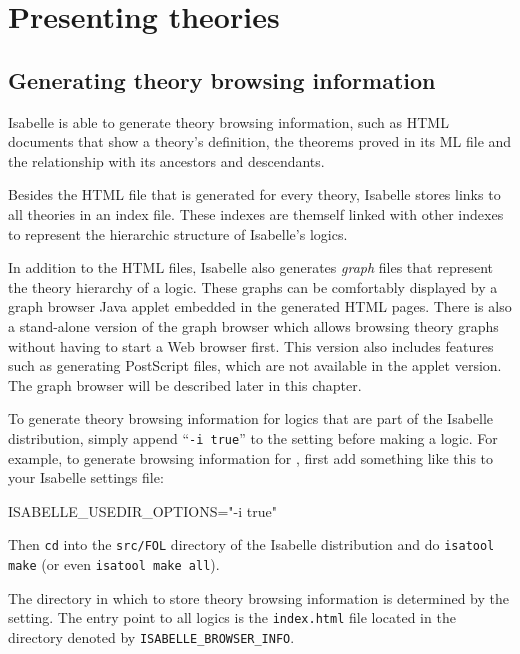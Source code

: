

\chapter{Presenting theories}

\section{Generating theory browsing information} \label{sec:info}

Isabelle is able to generate theory browsing information, such as HTML
documents that show a theory's definition, the theorems proved in its
ML file and the relationship with its ancestors and descendants.

Besides the HTML file that is generated for every theory, Isabelle
stores links to all theories in an index file. These indexes are
themself linked with other indexes to represent the hierarchic
structure of Isabelle's logics.

In addition to the HTML files, Isabelle also generates \emph{graph}
files that represent the theory hierarchy of a logic.  These graphs
can be comfortably displayed by a graph browser Java applet embedded
in the generated HTML pages. There is also a stand-alone version of
the graph browser which allows browsing theory graphs without having
to start a Web browser first. This version also includes features such
as generating {\sc PostScript} files, which are not available in the
applet version. The graph browser will be described later in this
chapter.

\medskip To generate theory browsing information for logics that are
part of the Isabelle distribution, simply append ``\texttt{-i true}''
to the  setting before making a logic.
For example, to generate browsing information for {\FOL}, first add
something like this to your Isabelle settings file:
\begin{ttbox}
ISABELLE_USEDIR_OPTIONS="-i true"
\end{ttbox}
Then \texttt{cd} into the \texttt{src/FOL} directory of the Isabelle
distribution and do \texttt{isatool make} (or even \texttt{isatool
  make all}).

\medskip The directory in which to store theory browsing information
is determined by the  setting.
The entry point to all logics is the {\tt index.html} file located in
the directory denoted by \texttt{ISABELLE_BROWSER_INFO}.

